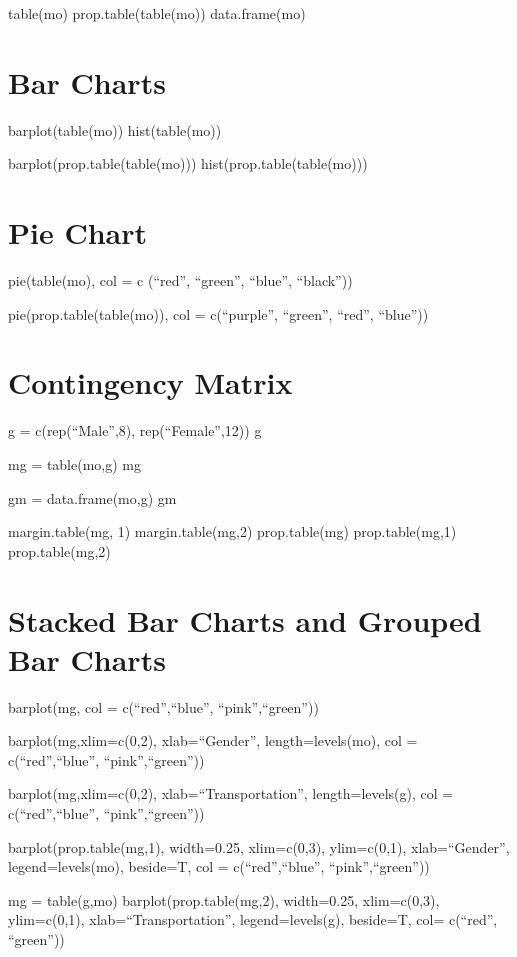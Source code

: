 \documentclass[
]{article}
\begin{document}
table(mo) prop.table(table(mo)) data.frame(mo)

\section{Bar Charts}\label{bar-charts}

barplot(table(mo)) hist(table(mo))

barplot(prop.table(table(mo))) hist(prop.table(table(mo)))

\section{Pie Chart}\label{pie-chart}

pie(table(mo), col = c (``red'', ``green'', ``blue'', ``black''))

pie(prop.table(table(mo)), col = c(``purple'', ``green'', ``red'',
``blue''))

\section{Contingency Matrix}\label{contingency-matrix}

g = c(rep(``Male'',8), rep(``Female'',12)) g

mg = table(mo,g) mg

gm = data.frame(mo,g) gm

margin.table(mg, 1) margin.table(mg,2) prop.table(mg) prop.table(mg,1)
prop.table(mg,2)

\section{Stacked Bar Charts and Grouped Bar
Charts}\label{stacked-bar-charts-and-grouped-bar-charts}

barplot(mg, col = c(``red'',``blue'', ``pink'',``green''))

barplot(mg,xlim=c(0,2), xlab=``Gender'', length=levels(mo), col =
c(``red'',``blue'', ``pink'',``green''))

barplot(mg,xlim=c(0,2), xlab=``Transportation'', length=levels(g), col =
c(``red'',``blue'', ``pink'',``green''))

barplot(prop.table(mg,1), width=0.25, xlim=c(0,3), ylim=c(0,1),
xlab=``Gender'', legend=levels(mo), beside=T, col = c(``red'',``blue'',
``pink'',``green''))

mg = table(g,mo) barplot(prop.table(mg,2), width=0.25, xlim=c(0,3),
ylim=c(0,1), xlab=``Transportation'', legend=levels(g), beside=T, col=
c(``red'', ``green''))
\end{document}
